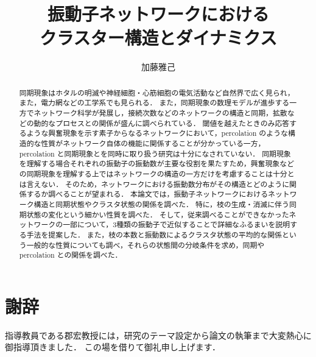\documentclass[system, bachelor]{systemB}%
\title{振動子ネットワークにおける\\クラスター構造とダイナミクス}
\author{加藤雅己}
\theoremstyle{break}
\begin{document}
\maketitle%

\frontmatter%



\begin{abstract}%
  同期現象はホタルの明滅や神経細胞・心筋細胞の電気活動など自然界で広く見られ，また，電力網などの工学系でも見られる．
  また，同期現象の数理モデルが進歩する一方でネットワーク科学が発展し，接続次数などのネットワークの構造と同期，拡散などの動的なプロセスとの関係が盛んに調べられている．  
  閾値を越えたときのみ応答するような興奮現象を示す素子からなるネットワークにおいて，percolation のような構造的な性質がネットワーク自体の機能に関係することが分かっている一方，
  percolation と同期現象とを同時に取り扱う研究は十分になされていない．
  同期現象を理解する場合それぞれの振動子の振動数が主要な役割を果たすため，興奮現象などの同期現象を理解する上ではネットワークの構造の一方だけを考慮することは十分とは言えない．
  そのため，ネットワークにおける振動数分布がその構造とどのように関係するか調べることが望まれる．
  本論文では，振動子ネットワークにおけるネットワーク構造と同期状態やクラスタ状態の関係を調べた．
  特に，枝の生成・消滅に伴う同期状態の変化という細かい性質を調べた．
  そして，従来調べることができなかったネットワークの一部について，3種類の振動子で近似することで詳細なふるまいを説明する手法を提案した．
  また，枝の本数と振動数によるクラスタ状態の平均的な関係という一般的な性質についても調べ，それらの状態間の分岐条件を求め，同期や percolation との関係を調べた．
\end{abstract}


{\makeatletter
\let\ps@jpl@in\ps@empty
\makeatother
\pagestyle{empty}
\tableofcontents
\clearpage}

\mainmatter%






\backmatter%
\chapter{謝辞}%
指導教員である郡宏教授には，研究のテーマ設定から論文の執筆まで大変熱心に御指導頂きました．
この場を借りて御礼申し上げます．


\appendix%

\end{document}
